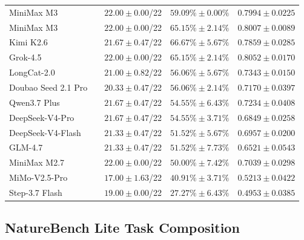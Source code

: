 \begin{table}[t]
\begin{tabular}{@{}llccc@{}}
MiniMax M3
& \openmleevo{}
& $22.00 \pm 0.00$/22
& $59.09\% \pm 0.00\%$
& $0.7994 \pm 0.0225$ \\

MiniMax M3
& \openmleevomax{}
& $22.00 \pm 0.00$/22
& $65.15\% \pm 2.14\%$
& $0.8007 \pm 0.0089$ \\

Kimi K2.6
& \openmleevo{}
& $21.67 \pm 0.47$/22
& $66.67\% \pm 5.67\%$
& $0.7859 \pm 0.0285$ \\

Grok-4.5
& \openmleevo{}
& $22.00 \pm 0.00$/22
& $65.15\% \pm 2.14\%$
& $0.8052 \pm 0.0170$ \\

LongCat-2.0
& \openmleevo{}
& $21.00 \pm 0.82$/22
& $56.06\% \pm 5.67\%$
& $0.7343 \pm 0.0150$ \\

Doubao Seed 2.1 Pro
& \openmleevo{}
& $20.33 \pm 0.47$/22
& $56.06\% \pm 2.14\%$
& $0.7170 \pm 0.0397$ \\

Qwen3.7 Plus
& \openmleevo{}
& $21.67 \pm 0.47$/22
& $54.55\% \pm 6.43\%$
& $0.7234 \pm 0.0408$ \\

DeepSeek-V4-Pro
& \openmleevo{}
& $21.67 \pm 0.47$/22
& $54.55\% \pm 3.71\%$
& $0.6849 \pm 0.0258$ \\

DeepSeek-V4-Flash
& \openmleevo{}
& $21.33 \pm 0.47$/22
& $51.52\% \pm 5.67\%$
& $0.6957 \pm 0.0200$ \\

GLM-4.7
& \openmleevo{}
& $21.33 \pm 0.47$/22
& $51.52\% \pm 7.73\%$
& $0.6521 \pm 0.0543$ \\

MiniMax M2.7
& \openmleevo{}
& $22.00 \pm 0.00$/22
& $50.00\% \pm 7.42\%$
& $0.7039 \pm 0.0298$ \\

MiMo-V2.5-Pro
& \openmleevo{}
& $17.00 \pm 1.63$/22
& $40.91\% \pm 3.71\%$
& $0.5213 \pm 0.0422$ \\

Step-3.7 Flash
& \openmleevo{}
& $19.00 \pm 0.00$/22
& $27.27\% \pm 6.43\%$
& $0.4953 \pm 0.0385$ \\

\bottomrule
\end{tabular}
\end{table}

\subsection{NatureBench Lite Task Composition}
\label{app:naturebench-lite}

